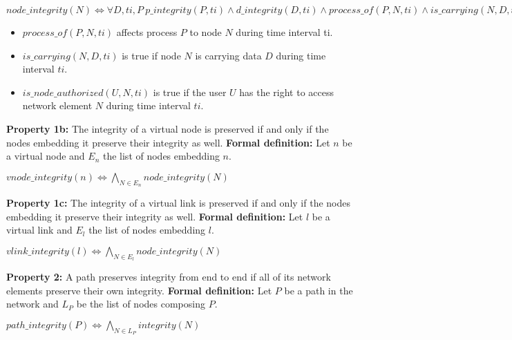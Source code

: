 \begin{myformula}
$node\_integrity(N) \Leftrightarrow \forall D,ti,P~p\_integrity(P,ti) \wedge d\_integrity(D,ti) \wedge process\_of(P,N,ti) \wedge is\_carrying(N,D,ti) \Rightarrow is\_node\_authorized(U,N,ti)$
\end{myformula}

\begin{itemize}
\item $process\_of(P,N,ti)$ affects process $P$ to node $N$ during time interval ti.
\item $is\_carrying(N,D,ti)$ is true if node $N$ is carrying data $D$ during time interval $ti$.
\item $is\_node\_authorized(U,N,ti)$ is true if the user $U$ has the right to access network element $N$ during time interval $ti$.
\end{itemize}

\textbf{Property 1b:} The integrity of a virtual node is preserved if and only if the nodes embedding it preserve their integrity as well.
\newline
\textbf{Formal definition:} Let $n$ be a virtual node and $E_n$ the list of nodes embedding $n$.

\begin{myformula}
$vnode\_integrity(n) \Leftrightarrow \bigwedge\limits_{N \in E_n} node\_integrity(N)$
\end{myformula}

\textbf{Property 1c:} The integrity of a virtual link is preserved if and only if the nodes embedding it preserve their integrity as well.
\newline
\textbf{Formal definition:} Let $l$ be a virtual link and $E_l$ the list of nodes embedding $l$.

\begin{myformula}
$vlink\_integrity(l) \Leftrightarrow \bigwedge\limits_{N \in E_l} node\_integrity(N)$
\end{myformula}


\textbf{Property 2:} A path preserves integrity from end to end if all of its network elements preserve their own integrity.
\newline \textbf{Formal definition:} Let $P$ be a path in the network and $L_P$ be the list of nodes composing $P$.
\newline

\begin{myformula}
$path\_integrity(P) \Leftrightarrow \bigwedge\limits_{N \in L_P}integrity(N) $
\end{myformula}

